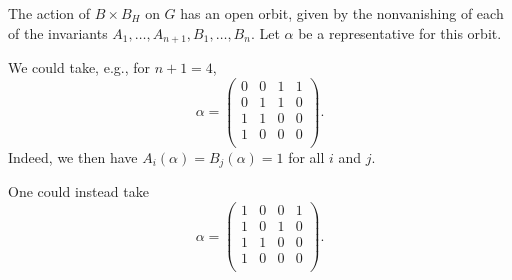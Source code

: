 \documentclass[reqno]{amsart} 
\begin{document}
The action of $B \times B_H$ on $G$ has an open orbit, given by the nonvanishing of each of the invariants $A_1,\dotsc,A_{n+1},B_1,\dotsc,B_n$.  Let $\alpha$ be a representative for this orbit.
\begin{example}\label{example:cj59m8hvjh}
We could take, e.g., for $n+1 = 4$,
\begin{equation}\label{eq:cj59nalcll}
\alpha =
\begin{pmatrix}
0 & 0 & 1 & 1 \\
0 & 1 & 1 & 0 \\
1 & 1 & 0 & 0 \\
1 & 0 & 0 & 0 \\
\end{pmatrix}.
\end{equation}
Indeed, we then have $A_i(\alpha) = B_j(\alpha) = 1$ for all $i$ and $j$.
\end{example}
\begin{example}
  One could instead take
  \begin{equation*}
    \alpha =
    \begin{pmatrix}
      1 & 0 & 0 & 1 \\
      1 & 0 & 1 & 0 \\
      1 & 1 & 0 & 0 \\
      1 & 0 & 0 & 0 \\
    \end{pmatrix}.
  \end{equation*}
\end{example}
\end{document}
